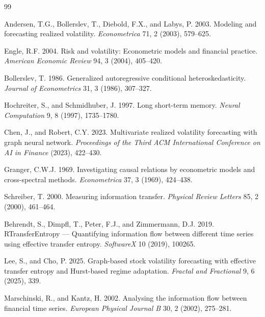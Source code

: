 \documentclass[12pt,oneside]{report}
\begin{document}

\begingroup
\singlespacing
\begin{thebibliography}{99}

Andersen, T.G., Bollerslev, T., Diebold, F.X., and Labys, P. 2003.
Modeling and forecasting realized volatility. \emph{Econometrica} 71, 2
(2003), 579--625.

Engle, R.F. 2004. Risk and volatility: Econometric models and financial
practice. \emph{American Economic Review} 94, 3 (2004), 405--420.

Bollerslev, T. 1986. Generalized autoregressive conditional
heteroskedasticity. \emph{Journal of Econometrics} 31, 3 (1986),
307--327.

Hochreiter, S., and Schmidhuber, J. 1997. Long short-term memory.
\emph{Neural Computation} 9, 8 (1997), 1735--1780.

Chen, J., and Robert, C.Y. 2023. Multivariate realized volatility
forecasting with graph neural network. \emph{Proceedings of the Third
ACM International Conference on AI in Finance} (2023), 422--430.

Granger, C.W.J. 1969. Investigating causal relations by econometric
models and cross-spectral methods. \emph{Econometrica} 37, 3 (1969),
424--438.

Schreiber, T. 2000. Measuring information transfer. \emph{Physical
Review Letters} 85, 2 (2000), 461--464.

Behrendt, S., Dimpfl, T., Peter, F.J., and Zimmermann, D.J. 2019.
RTransferEntropy --- Quantifying information flow between different time
series using effective transfer entropy. \emph{SoftwareX} 10 (2019),
100265.

Lee, S., and Cho, P. 2025. Graph-based stock volatility forecasting with
effective transfer entropy and Hurst-based regime adaptation.
\emph{Fractal and Fractional} 9, 6 (2025), 339.

Marschinski, R., and Kantz, H. 2002. Analysing the information flow
between financial time series. \emph{European Physical Journal B} 30, 2
(2002), 275--281.


\end{thebibliography}
\end{document}
